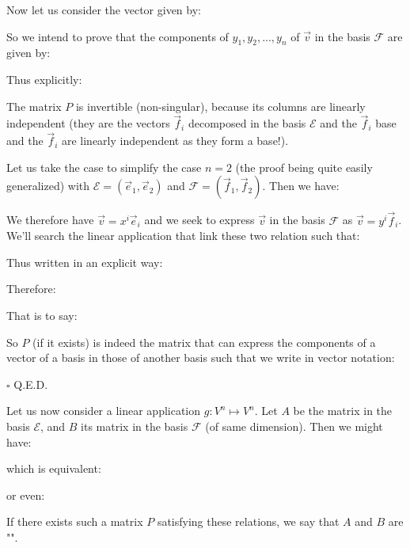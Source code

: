 	\begin{theorem}
	Now let us consider the vector given by:
	
	So we intend to prove that the components of $y_1,y_2,...,y_n$ of $\vec{v}$ in the basis $\mathcal{F}$ are given by:
	
	Thus explicitly:
	
	\begin{tcolorbox}[title=Remark,colframe=black,arc=10pt]
	The matrix $P$ is invertible (non-singular), because its columns are linearly independent (they are the vectors $\vec{f}_i$ decomposed in the basis $\mathcal{E}$ and the $\vec{f}_i$ base and the $\vec{f}_i$ are linearly independent as they form a base!).
	\end{tcolorbox}
	\end{theorem}
	\begin{dem}
	Let us take the case to simplify the case $n=2$ (the proof being quite easily generalized) with $\mathcal{E}=(\vec{e}_1,\vec{e}_2)$ and $\mathcal{F}=(\vec{f}_1,\vec{f}_2)$.
	Then we have:
	
	We therefore have $\vec{v}=x^i\vec{e}_i$ and we seek to express $\vec{v}$ in the basis $\mathcal{F}$ as $\vec{v}=y^i\vec{f}_i$. We'll search the linear application that link these two relation such that:
	
	Thus written in an explicit way:
	
	Therefore:
	
	That is to say:
	
	So $P$ (if it exists) is indeed the matrix that can express the components of a vector of a basis in those of another basis such that we write in vector notation:
	
	\begin{flushright}
		$\square$  Q.E.D.
	\end{flushright}
	\end{dem}
	\begin{theorem}
	Let us now consider a linear application $g:V^n\mapsto V^n$. Let $A$ be the matrix in the basis $\mathcal{E}$, and $B$ its matrix in the basis $\mathcal{F}$ (of same dimension). Then we might have:
	
	which is equivalent:
	
	or even:
	
	If there exists such a matrix $P$ satisfying these relations, we say that $A$ and $B$ are "".
	\end{theorem}
